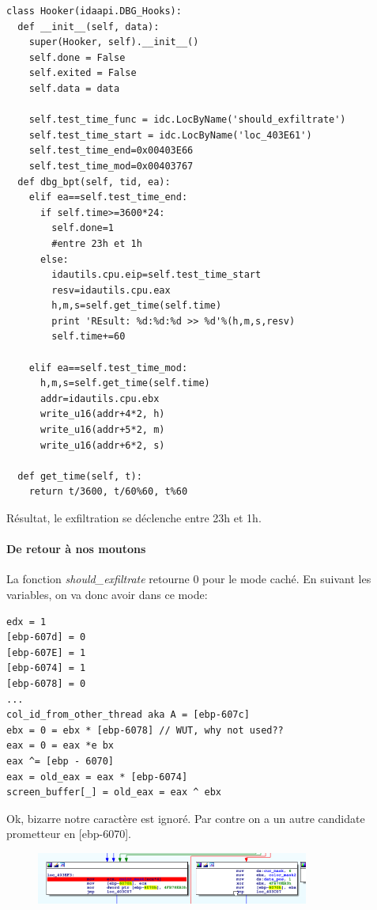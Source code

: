 \documentclass[14pt]{article}
\begin{document}
\begin{verbatim}
class Hooker(idaapi.DBG_Hooks):
  def __init__(self, data):
    super(Hooker, self).__init__()
    self.done = False
    self.exited = False
    self.data = data

    self.test_time_func = idc.LocByName('should_exfiltrate')
    self.test_time_start = idc.LocByName('loc_403E61')
    self.test_time_end=0x00403E66
    self.test_time_mod=0x00403767
  def dbg_bpt(self, tid, ea):
    elif ea==self.test_time_end:
      if self.time>=3600*24:
        self.done=1
        #entre 23h et 1h
      else:
        idautils.cpu.eip=self.test_time_start
        resv=idautils.cpu.eax
        h,m,s=self.get_time(self.time)
        print 'REsult: %d:%d:%d >> %d'%(h,m,s,resv)
        self.time+=60

    elif ea==self.test_time_mod:
      h,m,s=self.get_time(self.time)
      addr=idautils.cpu.ebx
      write_u16(addr+4*2, h)
      write_u16(addr+5*2, m)
      write_u16(addr+6*2, s)

  def get_time(self, t):
    return t/3600, t/60%60, t%60
\end{verbatim}

Résultat, le exfiltration se déclenche entre 23h et 1h.


\paragraph{De retour à nos moutons}
La fonction {\em should\_exfiltrate} retourne 0 pour le mode caché.
En suivant les variables, on va donc avoir dans ce mode:
\begin{verbatim}
edx = 1
[ebp-607d] = 0
[ebp-607E] = 1
[ebp-6074] = 1
[ebp-6078] = 0
...
col_id_from_other_thread aka A = [ebp-607c]
ebx = 0 = ebx * [ebp-6078] // WUT, why not used??
eax = 0 = eax *e bx
eax ^= [ebp - 6070]
eax = old_eax = eax * [ebp-6074]
screen_buffer[_] = old_eax = eax ^ ebx
\end{verbatim}
Ok, bizarre notre caractère est ignoré.
Par contre on a un autre candidate prometteur en [ebp-6070].

\begin{figure}[H]
\includegraphics[width=0.8\textwidth]{./imgs/video_trap.png}
\centering
\end{figure}
\end{document}
